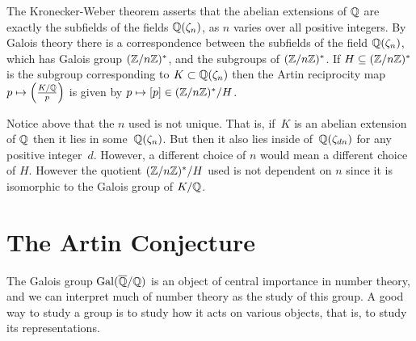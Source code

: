 The Kronecker-Weber theorem asserts that the abelian extensions of
$\mathbb{Q}$ are exactly the subfields of the fields $\mathbb{Q}(\zeta_n)$, as $n$
varies over all positive integers.  By Galois theory there is a
correspondence between the subfields of the field $\mathbb{Q}(\zeta_n)$,
which has Galois group $(\mathbb{Z}/n\mathbb{Z})^*$, and the subgroups of $(\mathbb{Z}/n\mathbb{Z})^*$.
If $H \subseteq (\mathbb{Z}/n\mathbb{Z})^*$ is the subgroup corresponding to
$K \subset \mathbb{Q}(\zeta_n)$ then the Artin reciprocity map
$p\mapsto \left(\frac{K/\mathbb{Q}}{p}\right)$ is given by $p\mapsto [p]\in (\mathbb{Z}/n\mathbb{Z})^*/H$.

\begin{remark}
  Notice above that the $n$ used is not unique. That is,
  if~$K$ is an abelian extension of $\mathbb{Q}$ then it lies in some~$\mathbb{Q}(\zeta_n)$.
  But then it also lies inside of~$\mathbb{Q}(\zeta_{dn})$ for any
  positive integer~$d$. However, a different choice of $n$
  would mean a different choice of $H$. However the
  quotient $(\mathbb{Z}/n\mathbb{Z})^*/H$ used is not dependent on $n$
  since it is isomorphic to the Galois group of $K/\mathbb{Q}$.
\end{remark}

\section{The Artin Conjecture}\label{sec:artin}

The Galois group $\operatorname{Gal}(\overline{\mathbb{Q}}/\mathbb{Q})$ is an object of central importance
in number theory, and we can interpret much of number theory as the
study of this group.  A good way to study a group is to study how it
acts on various objects, that is, to study its representations.

